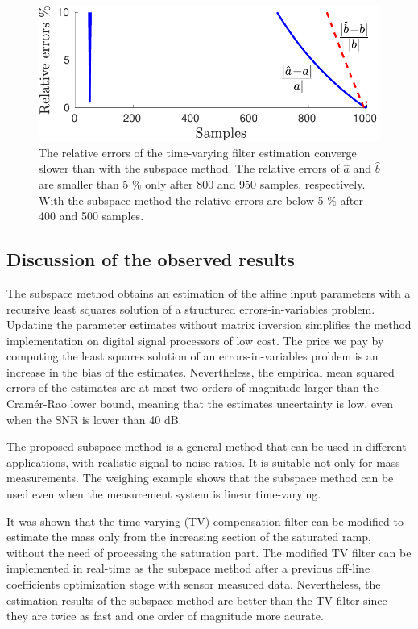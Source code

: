 \begin{figure}[!htbp]
\centering
\includegraphics[width=\columnwidth]{./ChapterRampInput/fig/Fig_9.pdf} 
\caption{ \label{fig:rele_tv_40dB_s1} The relative errors of the time-varying filter estimation converge slower than with the subspace method. 
The relative errors of $\widehat{a}$ and $\widehat{b}$ are smaller than 5 \% only after 800 and 950 samples, respectively.
With the subspace method the relative errors are below 5 \% after 400 and 500 samples. }
\end{figure}



\subsection{Discussion of the observed results}

The subspace method obtains an estimation of the affine input parameters with a recursive least squares solution of a structured errors-in-variables problem.
Updating the parameter estimates without matrix inversion simplifies the method implementation on digital signal processors of low cost.
The price we pay by computing the least squares solution of an errors-in-variables problem is an increase in the bias of the estimates.
Nevertheless, the empirical mean squared errors of the estimates are at most two orders of magnitude larger than the Cram\'er-Rao lower bound, meaning that the estimates uncertainty is low, even when the SNR is lower than 40 dB.


The proposed subspace method is a general method that can be used in different applications, with realistic signal-to-noise ratios. 
It is suitable not only for mass measurements.
The weighing example shows that the subspace method can be used even when the measurement system is linear time-varying.

It was shown that the time-varying (TV) compensation filter can be modified to estimate the mass only from the increasing section of the saturated ramp, without the need of processing the saturation part.
The modified TV filter can be implemented in real-time as the subspace method after a previous off-line coefficients optimization stage with sensor measured data.
Nevertheless, the estimation results of the subspace method are better than the TV filter since they are twice as fast and one order of magnitude more acurate.

